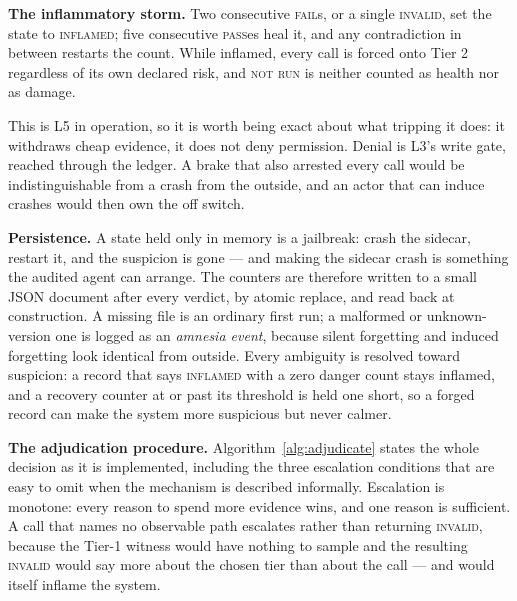 \documentclass[conference]{IEEEtran}
\begin{document}
\textbf{The inflammatory storm.} Two consecutive \textsc{fail}s, or a single
\textsc{invalid}, set the state to \textsc{inflamed}; five consecutive
\textsc{pass}es heal it, and any contradiction in between restarts the count.
While inflamed, every call is forced onto Tier 2 regardless of its own declared
risk, and \textsc{not run} is neither counted as health nor as damage.

This is L5 in operation, so it is worth being exact about what tripping it does:
it withdraws cheap evidence, it does not deny permission. Denial is L3's write
gate, reached through the ledger. A brake that also arrested every call would be
indistinguishable from a crash from the outside, and an actor that can induce
crashes would then own the off switch.

\textbf{Persistence.} A state held only in memory is a jailbreak: crash the
sidecar, restart it, and the suspicion is gone --- and making the sidecar crash
is something the audited agent can arrange. The counters are therefore written
to a small JSON document after every verdict, by atomic replace, and read back at
construction. A missing file is an ordinary first run; a malformed or
unknown-version one is logged as an \emph{amnesia event}, because silent
forgetting and induced forgetting look identical from outside. Every ambiguity is
resolved toward suspicion: a record that says \textsc{inflamed} with a zero
danger count stays inflamed, and a recovery counter at or past its threshold is
held one short, so a forged record can make the system more suspicious but never
calmer.

\textbf{The adjudication procedure.}
Algorithm~\ref{alg:adjudicate} states the whole decision as it is implemented,
including the three escalation conditions that are easy to omit when the
mechanism is described informally. Escalation is monotone: every reason to spend
more evidence wins, and one reason is sufficient. A call that names no
observable path escalates rather than returning \textsc{invalid}, because the
Tier-1 witness would have nothing to sample and the resulting \textsc{invalid}
would say more about the chosen tier than about the call --- and would itself
inflame the system.
\end{document}
